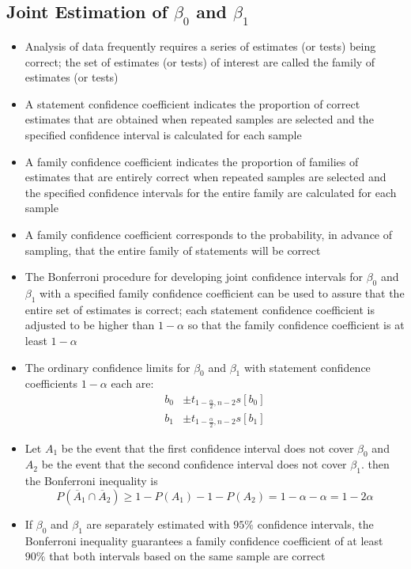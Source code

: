 \subsection{Joint Estimation of $\beta_0$ and $\beta_1$}
\begin{itemize}
\item Analysis of data frequently requires a series of estimates (or tests) being correct; the set of estimates (or tests) of interest are called the family of estimates (or tests)
\item A statement confidence coefficient indicates the proportion of correct estimates that are obtained when repeated samples are selected and the specified confidence interval is calculated for each sample 
\item A family confidence coefficient indicates the proportion of families of estimates that are entirely correct when repeated samples are selected and the specified confidence intervals for the entire family are calculated for each sample 
\item A family confidence coefficient corresponds to the probability, in advance of sampling, that the entire family of statements will be correct
\item The Bonferroni procedure for developing joint confidence intervals for $\beta_0$ and $\beta_1$ with a specified family confidence coefficient can be used to assure that the entire set of estimates is correct; each statement confidence coefficient is adjusted to be higher than $1-\alpha$ so that the family confidence coefficient is at least $1-\alpha$
\item The ordinary confidence limits for $\beta_0$ and $\beta_1$ with statement confidence coefficients $1-\alpha$ each are: $$ \begin{aligned} b_0 &\pm t_{1 - \frac{\alpha}{2}, n-2}s[b_0] \\ b_1 &\pm t_{1 - \frac{\alpha}{2}, n-2}s[b_1] \end{aligned} $$ 
\item Let $A_1$ be the event that the first confidence interval does not cover $\beta_0$ and $A_2$ be the event that the second confidence interval does not cover $\beta_1$. then the Bonferroni inequality is 
$$ P(\overline{A}_1 \cap \overline{A}_2) \geq 1 - P(A_1) - 1 - P(A_2) = 1 - \alpha - \alpha = 1 - 2\alpha $$ 
\item If $\beta_0$ and $\beta_1$ are separately estimated with $95\%$ confidence intervals, the Bonferroni inequality guarantees a family confidence coefficient of at least $90\%$ that both intervals based on the same sample are correct

\end{itemize}
